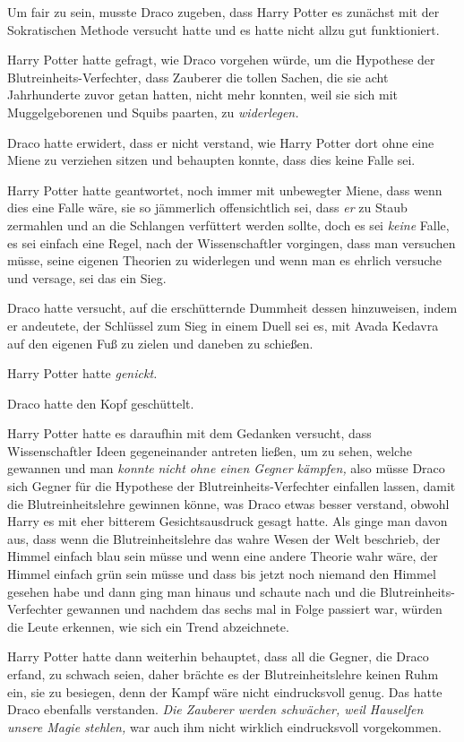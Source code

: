 {Um fair zu sein, musste Draco zugeben, dass Harry Potter es zunächst mit der Sokratischen Methode versucht hatte und es hatte nicht allzu gut funktioniert.

Harry Potter hatte gefragt, wie Draco vorgehen würde, um die Hypothese der Blutreinheits-Verfechter, dass Zauberer die tollen Sachen, die sie acht Jahrhunderte zuvor getan hatten, nicht mehr konnten, weil sie sich mit Muggelgeborenen und Squibs paarten, zu \emph{widerlegen.}

Draco hatte erwidert, dass er nicht verstand, wie Harry Potter dort ohne eine Miene zu verziehen sitzen und behaupten konnte, dass dies keine Falle sei.

Harry Potter hatte geantwortet, noch immer mit unbewegter Miene, dass wenn dies eine Falle wäre, sie so jämmerlich offensichtlich sei, dass \emph{er} zu Staub zermahlen und an die Schlangen verfüttert werden sollte, doch es sei \emph{keine} Falle, es sei einfach eine Regel, nach der Wissenschaftler vorgingen, dass man versuchen müsse, seine eigenen Theorien zu widerlegen und wenn man es ehrlich versuche und versage, sei das ein Sieg.

Draco hatte versucht, auf die erschütternde Dummheit dessen hinzuweisen, indem er andeutete, der Schlüssel zum Sieg in einem Duell sei es, mit Avada Kedavra auf den eigenen Fuß zu zielen und daneben zu schießen.

Harry Potter hatte \emph{genickt.}

Draco hatte den Kopf geschüttelt.

Harry Potter hatte es daraufhin mit dem Gedanken versucht, dass Wissenschaftler Ideen gegeneinander antreten ließen, um zu sehen, welche gewannen und man \emph{konnte} \emph{nicht ohne einen Gegner kämpfen,} also müsse Draco sich Gegner für die Hypothese der Blutreinheits-Verfechter einfallen lassen, damit die Blutreinheitslehre gewinnen könne, was Draco etwas besser verstand, obwohl Harry es mit eher bitterem Gesichtsausdruck gesagt hatte. Als ginge man davon aus, dass wenn die Blutreinheitslehre das wahre Wesen der Welt beschrieb, der Himmel einfach blau sein müsse und wenn eine andere Theorie wahr wäre, der Himmel einfach grün sein müsse und dass bis jetzt noch niemand den Himmel gesehen habe und dann ging man hinaus und schaute nach und die Blutreinheits-Verfechter gewannen und nachdem das sechs mal in Folge passiert war, würden die Leute erkennen, wie sich ein Trend abzeichnete.

Harry Potter hatte dann weiterhin behauptet, dass all die Gegner, die Draco erfand, zu schwach seien, daher brächte es der Blutreinheitslehre keinen Ruhm ein, sie zu besiegen, denn der Kampf wäre nicht eindrucksvoll genug. Das hatte Draco ebenfalls verstanden. \emph{Die Zauberer werden schwächer, weil Hauselfen unsere Magie stehlen,} war auch ihm nicht wirklich eindrucksvoll vorgekommen.

}

